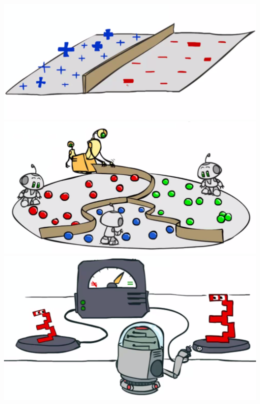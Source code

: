 \documentclass[twocolumn]{article}
\begin{document}
{\includegraphics[scale=0.5]{snapshot148}\\
\includegraphics[scale=0.5]{snapshot151}\\
\includegraphics[scale=0.35]{snapshot152}\\
}
\end{document}
